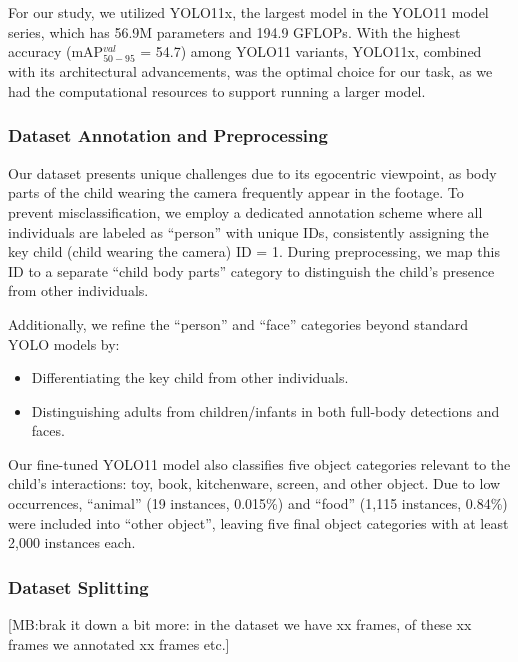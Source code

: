 \documentclass[
  man,floatsintext]{apa6}
\providecommand{\tightlist}{%
  \setlength{\itemsep}{0pt}\setlength{\parskip}{0pt}}
\begin{document}
For our study, we utilized YOLO11x, the largest model in the YOLO11 model series, which has 56.9M parameters and 194.9 GFLOPs. With the highest accuracy (mAP\(^{val}_{50-95}\) = 54.7) among YOLO11 variants, YOLO11x, combined with its architectural advancements, was the optimal choice for our task, as we had the computational resources to support running a larger model.

\subsubsection{Dataset Annotation and Preprocessing}\label{dataset-annotation-and-preprocessing}

Our dataset presents unique challenges due to its egocentric viewpoint, as body parts of the child wearing the camera frequently appear in the footage. To prevent misclassification, we employ a dedicated annotation scheme where all individuals are labeled as ``person'' with unique IDs, consistently assigning the key child (child wearing the camera) ID = 1. During preprocessing, we map this ID to a separate ``child body parts'' category to distinguish the child's presence from other individuals.

Additionally, we refine the ``person'' and ``face'' categories beyond standard YOLO models by:

\begin{itemize}
\tightlist
\item
  Differentiating the key child from other individuals.
\item
  Distinguishing adults from children/infants in both full-body detections and faces.
\end{itemize}

Our fine-tuned YOLO11 model also classifies five object categories relevant to the child's interactions: toy, book, kitchenware, screen, and other object. Due to low occurrences, ``animal'' (19 instances, 0.015\%) and ``food'' (1,115 instances, 0.84\%) were included into ``other object'', leaving five final object categories with at least 2,000 instances each.

\subsubsection{Dataset Splitting}\label{dataset-splitting}

{[}MB:brak it down a bit more: in the dataset we have xx frames, of these xx frames we annotated xx frames etc.{]}
\end{document}
